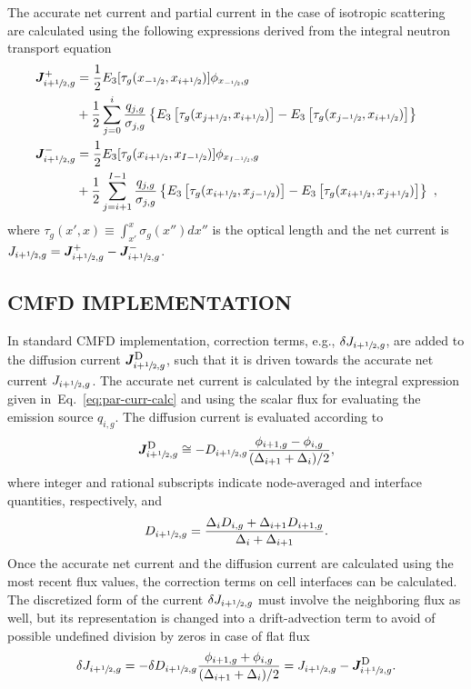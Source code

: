 \documentclass[letterpaper]{physor2020}
\newcommand{\mcL}{\tau}
\newcommand{\jp}{\ensuremath{\bm{J}^+}}
\newcommand{\jm}{\ensuremath{\bm{J}^-}}
\newcommand{\jD}{\ensuremath{\bm{J}^{\textrm{\scriptsize{D}}}}}
\newcommand{\hzi}{\ensuremath{\sfrac{1}{2}}}
\newcommand{\mcL}{\tau}
\newcommand{\jp}{\ensuremath{J^+}}
\newcommand{\jm}{\ensuremath{J^-}}
\newcommand{\jD}{\ensuremath{J^{\textrm{\scriptsize{D}}}}}
\newcommand{\hzi}{\ensuremath{\sfrac{1}{2}}}
\begin{document}
The accurate net current and partial current in the case of isotropic scattering are calculated using the following expressions derived from the integral neutron transport equation~\cite{Tomatis-2011,Tomatis-2019,Gross-2020}
\begin{align}\label{eq:par-curr-calc}
\jp_{i+\hzi,g} &=  \frac{1}{2}
E_3[\mcL_g(x_{-\hzi},x_{i+\hzi})] \phi_{x_{-\hzi},g} \nonumber \\
&+
\frac{1}{2}\sum\limits_{j=0}^i \frac{q_{j,g}}{\sigma_{j,g}}
\left\{ 
E_3\left[
\mcL_g(x_{j+\hzi},x_{i+\hzi}) 
\right]
- E_3\left[
\mcL_g(x_{j-\hzi},x_{i+\hzi})
\right] 
\right\} 
\nonumber \\
\jm_{i+\hzi,g} &=  \frac{1}{2}
E_3[\mcL_g(x_{i+\hzi},x_{I-\hzi})] \phi_{x_{I-\hzi},g} \nonumber \\
&+
\frac{1}{2}\sum\limits_{j=i+1}^{I-1} \frac{q_{j,g}}{\sigma_{j,g}}
\left\{ 
E_3\left[
\mcL_g(x_{i+\hzi},x_{j-\hzi}) 
\right]
- E_3\left[ 
\mcL_g(x_{i+\hzi},x_{j+\hzi})
\right] 
\right\} \,\, ,
\end{align}
where $\mcL_g(x',x)\equiv \int_{x'}^{x} \sigma_g(x'')dx''$ is the optical length and the net current is $J _{i+\hzi,g} = \jp _{i+\hzi,g} - \jm _{i+\hzi,g}$.

\subsection{CMFD IMPLEMENTATION}
\label{sec:RM-CMFD}

In standard CMFD implementation, correction terms, e.g., $\delta J_{i+\hzi,g}$, are added to the diffusion current $\jD_{i+\hzi,g}$, such that it is driven towards the accurate net current $J_{i+\hzi,g}$. The accurate net current is calculated by the integral expression given in~Eq.~\ref{eq:par-curr-calc} and using the scalar flux for evaluating the emission source $q_{i,g}$. The diffusion current is evaluated according to 
\begin{equation}\label{eq:JD}
\jD_{i+\hzi,g} \cong -D_{i+\hzi,g} 
\frac{\phi_{i+1,g} - \phi_{i,g}}
{(\Delta_{i+1} + \Delta_i)/2},
\end{equation}
where integer and rational subscripts indicate node-averaged and interface quantities, respectively, and 
\begin{equation}\label{eq:Ds}
D_{i+\hzi,g} = \frac{\Delta_i D_{i,g} + \Delta_{i+1} D_{i+1,g}}
{\Delta_i + \Delta_{i+1}}.
\end{equation}
%
Once the accurate net current and the diffusion current are calculated using the most recent flux values, the correction terms on cell interfaces can be calculated. The discretized form of the current $\delta J_{i+\hzi,g}$ must involve the neighboring flux as well, but its representation is changed into a drift-advection term to avoid of possible undefined division by zeros in case of flat flux~\cite{Smith-1983,Tomatis-2011}
\begin{equation}
\delta J_{i+\hzi,g} = -\delta D_{i+\hzi,g} 
\frac{\phi_{i+1,g} + \phi_{i,g}}
{(\Delta_{i+1} + \Delta_i)/2} 
= J_{i+\hzi,g} - \jD_{i+\hzi,g}.
\end{equation}
\end{document}
